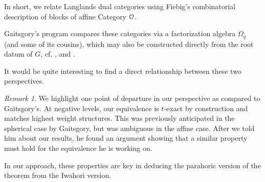 \documentclass[11pt,reqno]{amsart}
\theoremstyle{remark}
\newtheorem{re}[subsubsection]{Remark}
\numberwithin{equation}{section}
\begin{document}
In short, we relate Langlands dual categories using Fiebig's
combinatorial description of blocks of affine Category $\EuScript{O}$.

Gaitsgory's program compares these categories via a
factorization algebra $\Omega_q$ (and some of its cousins),
which may also be constructed directly from the root datum of
$G$, cf. \cite{fact4}, \cite{paris-notes} and \cite{fact1}.

It would be quite interesting to find a direct relationship between
these two perspectives.

\begin{re}

We highlight one point of departure in our perspective as compared
to Gaitsgory's. At negative levels, our equivalence is $t$-exact
by construction and matches highest weight structures. 
This was previously anticipated in the spherical case by Gaitsgory,
but was ambiguous in the affine case. After we told him about
our results, he found an argument showing 
that a similar property must hold 
for the equivalence he is working on.

In our approach, these properties are key in deducing the
parahoric version of the theorem from the Iwahori version. 

\end{re}




  
































  
\end{document}
